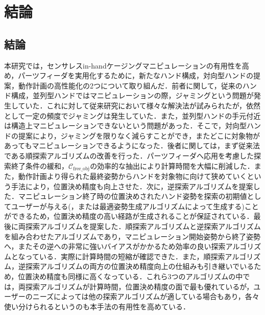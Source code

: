 \documentclass[a4paper,twoside,12pt,papersize, dvipdfmx]{iirthesis}
\begin{document}
    \newcommand{\figref}[1]{\figurename\ref{#1}}
    \newcommand{\tabref}[1]{\tablename\ref{#1}}
    \renewcommand{\eqref}[1]{式~(\ref{#1})}
    \newcommand{\chapref}[1]{\ref{#1}章}
    \newcommand{\secref}[1]{\ref{#1}節}
    \newcommand{\ssecref}[1]{\ref{#1}項}
    \newcommand{\appref}[1]{付録\ref{#1}}
\fi


\chapter{結論}\label{chap::conclusion}
\minitoc
\section{結論}\label{sec::conclusion::conclusion}
本研究では，センサレスin-handケージングマニピュレーションの有用性を高め，パーツフィーダを実用化するために，新たなハンド構成，対向型ハンドの提案，動作計画の高性能化の2つについて取り組んだ．前者に関して，従来のハンド構成，並列型ハンドではマニピュレーションの際，ジャミングという問題が発生していた．これに対して従来研究において様々な解決法が試みられたが，依然として一定の頻度でジャミングは発生していた．また，並列型ハンドの手元付近は構造上マニピュレーションできないという問題があった．そこで，対向型ハンドの提案により，ジャミングを限りなく減らすことができ，またどこに対象物があってもマニピュレーションできるようになった．後者に関しては，まず従来法である順探索アルゴリズムの改善を行った．パーツフィーダへ応用を考慮した探索終了条件の緩和，$\mathcal{C}_{\mathrm{free\_obj}}$の効率的な抽出により計算時間を大幅に削減した．また，動作計画より得られた最終姿勢からハンドを対象物に向けて狭めていくという手法により，位置決め精度も向上させた．次に，逆探索アルゴリズムを提案した．マニピュレーション終了時の位置決めされたハンド姿勢を探索の初期値としてユーザーが与える(，または最適姿勢生成アルゴリズムによって生成する)ことができるため，位置決め精度の高い経路が生成されることが保証されている．最後に両探索アルゴリズムを提案した．順探索アルゴリズムと逆探索アルゴリズムを組み合わせたアルゴリズムであり，マニピュレーション開始姿勢から終了姿勢へ，またその逆への非常に強いバイアスがかかるため効率の良い探索アルゴリズムとなっている．実際に計算時間の短縮が確認できた．また，順探索アルゴリズム，逆探索アルゴリズムの両方の位置決め精度向上の仕組みも引き継いでいるため，位置決め精度も同様に高くなっている．これら3つのアルゴリズムの中では，両探索アルゴリズムが計算時間，位置決め精度の面で最も優れているが，ユーザーのニーズによっては他の探索アルゴリズムが適している場合もあり，各々使い分けられるというのも本手法の有用性を高めている．\par
\end{document}
